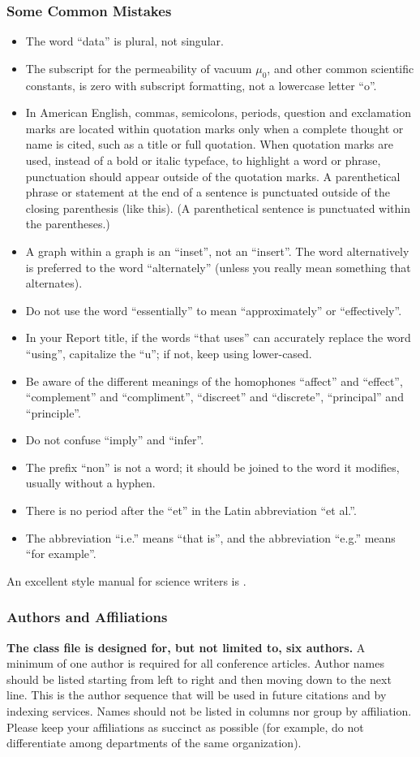 \documentclass[conference]{IEEEtran}
\begin{document}
\subsubsection{Some Common Mistakes}\label{SCM}
\begin{itemize}
\item The word ``data'' is plural, not singular.
\item The subscript for the permeability of vacuum $\mu_{0}$, and other common scientific constants, is zero with subscript formatting, not a lowercase letter ``o''.
\item In American English, commas, semicolons, periods, question and exclamation marks are located within quotation marks only when a complete thought or name is cited, such as a title or full quotation. When quotation marks are used, instead of a bold or italic typeface, to highlight a word or phrase, punctuation should appear outside of the quotation marks. A parenthetical phrase or statement at the end of a sentence is punctuated outside of the closing parenthesis (like this). (A parenthetical sentence is punctuated within the parentheses.)
\item A graph within a graph is an ``inset'', not an ``insert''. The word alternatively is preferred to the word ``alternately'' (unless you really mean something that alternates).
\item Do not use the word ``essentially'' to mean ``approximately'' or ``effectively''.
\item In your Report title, if the words ``that uses'' can accurately replace the word ``using'', capitalize the ``u''; if not, keep using lower-cased.
\item Be aware of the different meanings of the homophones ``affect'' and ``effect'', ``complement'' and ``compliment'', ``discreet'' and ``discrete'', ``principal'' and ``principle''.
\item Do not confuse ``imply'' and ``infer''.
\item The prefix ``non'' is not a word; it should be joined to the word it modifies, usually without a hyphen.
\item There is no period after the ``et'' in the Latin abbreviation ``et al.''.
\item The abbreviation ``i.e.'' means ``that is'', and the abbreviation ``e.g.'' means ``for example''.
\end{itemize}
An excellent style manual for science writers is \cite{bayesian_vsr_2014}.

\subsubsection{Authors and Affiliations}
\textbf{The class file is designed for, but not limited to, six authors.} A 
minimum of one author is required for all conference articles. Author names 
should be listed starting from left to right and then moving down to the 
next line. This is the author sequence that will be used in future citations 
and by indexing services. Names should not be listed in columns nor group by 
affiliation. Please keep your affiliations as succinct as possible (for 
example, do not differentiate among departments of the same organization).
\end{document}
